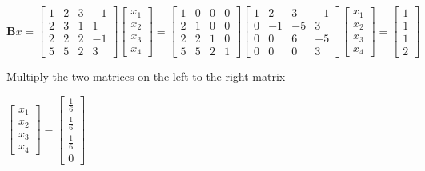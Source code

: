 \documentclass[english,onecolumn]{IEEEtran}
\begin{document}
\begin{enumerate}
\begin{enumerate}
		  $\mathbf{B}x = \begin{bmatrix}
		  	1 & 2 & 3 & -1\\
		  	2 & 3 & 1 & 1\\
		  	2 & 2 & 2 & -1\\
		  	5 & 5 & 2 & 3
		  \end{bmatrix}\left[\begin{array}{c}
		  	x_1\\
		  	x_2\\
		  	x_3\\
		  	x_4 
		  \end{array}\right] = 
		  \begin{bmatrix}
		  	1 & 0 & 0 & 0 \\
		  	2 & 1 & 0 & 0 \\
		  	2 & 2 & 1 & 0 \\
		  	5 & 5 & 2 & 1
		  \end{bmatrix}
		  \begin{bmatrix}
		  	1 & 2 & 3 & -1 \\
		  	0 & -1 & -5 & 3 \\
		  	0 & 0 & 6 & -5 \\
		  	0 & 0 & 0 & 3
		  \end{bmatrix}
		  \left[\begin{array}{c}
		  	x_1\\
		  	x_2\\
		  	x_3\\
		  	x_4 
		  \end{array}\right]
		  =
		  \left[\begin{array}{c}
		  	1\\
		  	1\\
		  	1\\
		  	2
		  \end{array}\right]
		  $
		  
		  Multiply the two matrices on the left to the right matrix
		  
		  $
		  \left[\begin{array}{c}
		  	x_1\\
		  	x_2\\
		  	x_3\\
		  	x_4 
		  \end{array}\right] = \left[\begin{array}{c}
		  	\frac{1}{6}\\
		  	\frac{1}{6}\\
		  	\frac{1}{6}\\
		  	0
		  \end{array}\right]
		  $
		  

\end{enumerate}
\end{enumerate}
\end{document}
